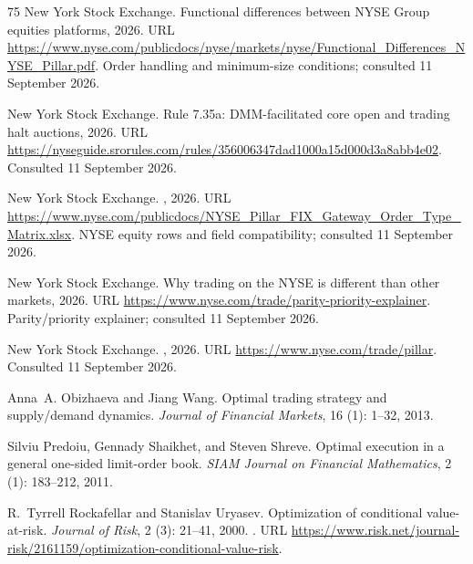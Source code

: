 \documentclass[11pt]{article}
\numberwithin{equation}{section}
\theoremstyle{definition}
\theoremstyle{remark}
\theoremstyle{definition}
\begin{document}
\begin{thebibliography}{75}
{New York Stock Exchange}.
\newblock Functional differences between {NYSE Group} equities platforms,
  2026{}.
\newblock URL
  \url{https://www.nyse.com/publicdocs/nyse/markets/nyse/Functional_Differences_NYSE_Pillar.pdf}.
\newblock Order handling and minimum-size conditions; consulted 11 September
  2026.

{New York Stock Exchange}.
\newblock Rule 7.35a: {DMM}-facilitated core open and trading halt auctions,
  2026{}.
\newblock URL
  \url{https://nyseguide.srorules.com/rules/356006347dad1000a15d000d3a8abb4e02}.
\newblock Consulted 11 September 2026.

{New York Stock Exchange}.
, 2026{}.
\newblock URL
  \url{https://www.nyse.com/publicdocs/NYSE_Pillar_FIX_Gateway_Order_Type_Matrix.xlsx}.
\newblock NYSE equity rows and field compatibility; consulted 11 September
  2026.

{New York Stock Exchange}.
\newblock Why trading on the {NYSE} is different than other markets,
  2026{}.
\newblock URL \url{https://www.nyse.com/trade/parity-priority-explainer}.
\newblock Parity/priority explainer; consulted 11 September 2026.

{New York Stock Exchange}.
, 2026{}.
\newblock URL \url{https://www.nyse.com/trade/pillar}.
\newblock Consulted 11 September 2026.

Anna~A. Obizhaeva and Jiang Wang.
\newblock Optimal trading strategy and supply/demand dynamics.
\newblock \emph{Journal of Financial Markets}, 16 (1): 1--32,
  2013.

Silviu Predoiu, Gennady Shaikhet, and Steven Shreve.
\newblock Optimal execution in a general one-sided limit-order book.
\newblock \emph{SIAM Journal on Financial Mathematics}, 2
  (1): 183--212, 2011.

R.~Tyrrell Rockafellar and Stanislav Uryasev.
\newblock Optimization of conditional value-at-risk.
\newblock \emph{Journal of Risk}, 2 (3): 21--41, 2000.
\newblock {}.
\newblock URL
  \url{https://www.risk.net/journal-risk/2161159/optimization-conditional-value-risk}.


\end{thebibliography}
\end{document}
